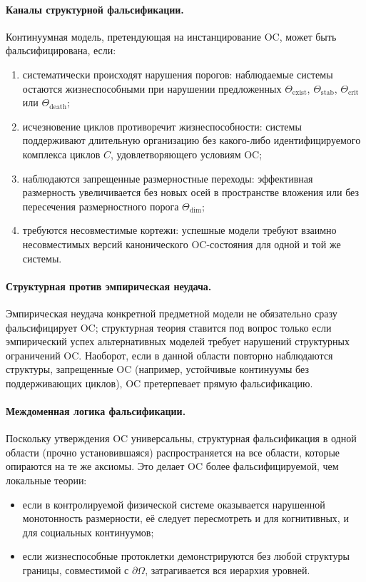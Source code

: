 \paragraph{Каналы структурной фальсификации.}
Континуумная модель, претендующая на инстанцирование OC, может быть
фальсифицирована, если:
\begin{enumerate}
  \item 
        систематически происходят нарушения порогов: наблюдаемые системы
        остаются жизнеспособными при нарушении предложенных
        \(\Theta_{\mathrm{exist}}\), \(\Theta_{\mathrm{stab}}\),
        \(\Theta_{\mathrm{crit}}\) или \(\Theta_{\mathrm{death}}\);
  \item 
        исчезновение циклов противоречит жизнеспособности: системы
        поддерживают длительную организацию без какого-либо идентифицируемого
        комплекса циклов \(C\), удовлетворяющего условиям OC;
  \item 
        наблюдаются запрещенные размерностные переходы: эффективная размерность
        увеличивается без новых осей в пространстве вложения или без пересечения
        размерностного порога \(\Theta_{\mathrm{dim}}\);
  \item 
        требуются несовместимые кортежи: успешные модели требуют взаимно
        несовместимых версий канонического OC-состояния для одной и той же
        системы.
\end{enumerate}

\paragraph{Структурная против эмпирическая неудача.}
Эмпирическая неудача конкретной предметной модели не обязательно сразу
фальсифицирует OC; структурная теория ставится под вопрос только если
эмпирический успех альтернативных моделей требует нарушений структурных
ограничений OC. Наоборот, если в данной области повторно наблюдаются
структуры, запрещенные OC (например, устойчивые континуумы без поддерживающих
циклов), OC претерпевает прямую фальсификацию.

\paragraph{Междоменная логика фальсификации.}
Поскольку утверждения OC универсальны, структурная фальсификация в одной
области (прочно установившаяся) распространяется на все области, которые
опираются на те же аксиомы. Это делает OC более фальсифицируемой, чем
локальные теории:
\begin{itemize}
  \item если в контролируемой физической системе оказывается нарушенной
        монотонность размерности, её следует пересмотреть и для когнитивных,
        и для социальных континуумов;
  \item если жизнеспособные протоклетки демонстрируются без любой
        структуры границы, совместимой с \(\partial\Omega\), затрагивается
        вся иерархия уровней.
\end{itemize}

